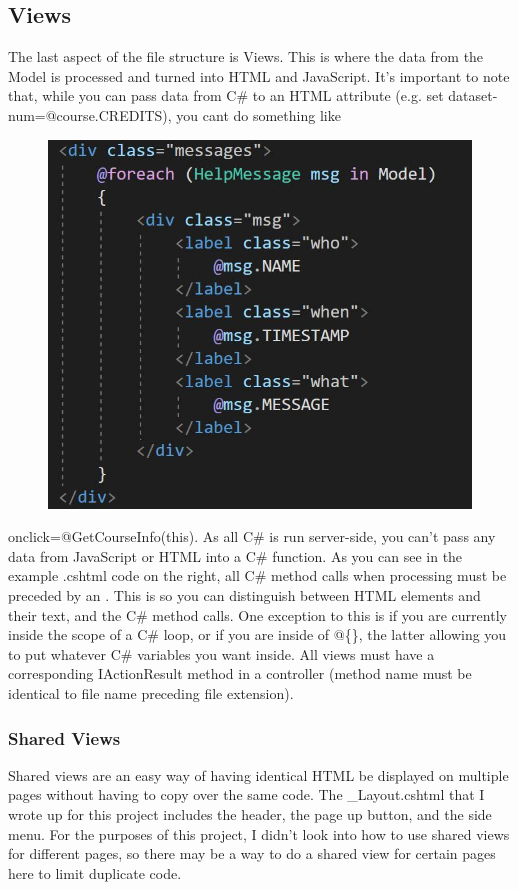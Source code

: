 \documentclass[12pt]{article}
\begin{document}
		\subsection{Views}
			The last aspect of the file structure is Views. This is where the data from the Model is processed and turned into HTML and JavaScript. It's important to note that, while you can pass data from C\# to an HTML attribute (e.g. set dataset-num=@course.CREDITS), you cant do something like
			\begin{figure}
				\centering
				\vspace*{-.75cm}\includegraphics[scale=.3]{cshtmlexample}
			\end{figure} onclick=@GetCourseInfo(this). As all C\# is run server-side, you can't pass any data from JavaScript or HTML into a C\# function. As you can see in the example .cshtml code on the right, all C\# method calls when processing must be preceded by an \@. This is so you can distinguish between HTML elements and their text, and the C\# method calls. One exception to this is if you are currently inside the scope of a C\# loop, or if you are inside of @\{\}, the latter allowing you to put whatever C\# variables you want inside. All views must have a corresponding IActionResult method in a controller (method name must be identical to file name preceding file extension).
			\subsubsection{Shared Views}
				Shared views are an easy way of having identical HTML be displayed on multiple pages without having to copy over the same code. The \_Layout.cshtml that I wrote up for this project includes the header, the page up button, and the side menu. For the purposes of this project, I didn't look into how to use shared views for different pages, so there may be a way to do a shared view for certain pages here to limit duplicate code.
\end{document}
